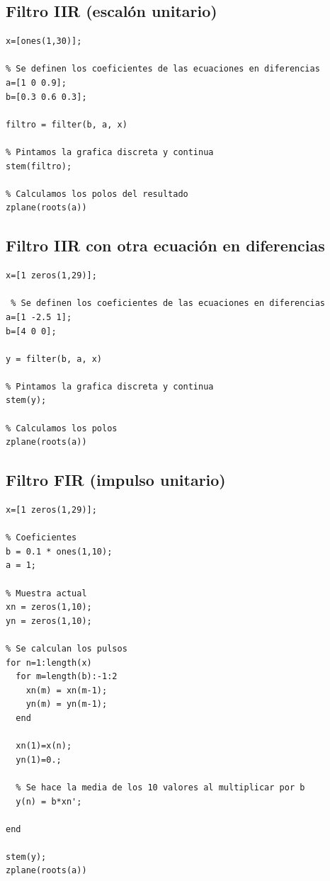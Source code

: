 \documentclass[11pt,a4paper]{article}
\begin{document}
\subsection{Filtro IIR (escalón unitario)}
\label{code3}

\begin{lstlisting}[frame=single]
% Se define el array con los pulsos
x=[ones(1,30)];

% Se definen los coeficientes de las ecuaciones en diferencias
a=[1 0 0.9];
b=[0.3 0.6 0.3];

filtro = filter(b, a, x)

% Pintamos la grafica discreta y continua
stem(filtro);

% Calculamos los polos del resultado
zplane(roots(a))
\end{lstlisting}

\subsection{Filtro IIR con otra ecuación en diferencias}
\label{code4}

\begin{lstlisting}[frame=single]
% Se define el array con los pulsos
x=[1 zeros(1,29)];

 % Se definen los coeficientes de las ecuaciones en diferencias
a=[1 -2.5 1];
b=[4 0 0];

y = filter(b, a, x)

% Pintamos la grafica discreta y continua
stem(y);

% Calculamos los polos
zplane(roots(a))
\end{lstlisting}

\subsection{Filtro FIR (impulso unitario)}
\label{code5}

\begin{lstlisting}[frame=single]
% Se define el array con los pulsos
x=[1 zeros(1,29)];

% Coeficientes
b = 0.1 * ones(1,10);
a = 1;

% Muestra actual
xn = zeros(1,10);
yn = zeros(1,10);

% Se calculan los pulsos
for n=1:length(x)
  for m=length(b):-1:2
    xn(m) = xn(m-1);
    yn(m) = yn(m-1);
  end

  xn(1)=x(n);
  yn(1)=0.;

  % Se hace la media de los 10 valores al multiplicar por b
  y(n) = b*xn';

end

stem(y);
zplane(roots(a))
\end{lstlisting}
\end{document}

